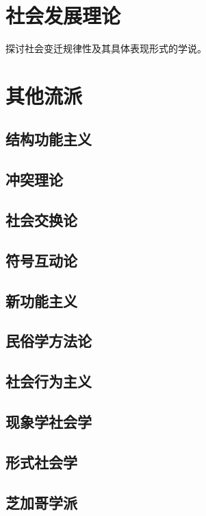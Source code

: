 \documentclass[UTF8]{../RepresentationUniverse}
\begin{document}
\section{社会发展理论}
探讨社会变迁规律性及其具体表现形式的学说。


\section{其他流派}

\subsection{结构功能主义}
\subsection{冲突理论}
\subsection{社会交换论}
\subsection{符号互动论}
\subsection{新功能主义}
\subsection{民俗学方法论}
\subsection{社会行为主义}
\subsection{现象学社会学}
\subsection{形式社会学}
\subsection{芝加哥学派}
\end{document}
